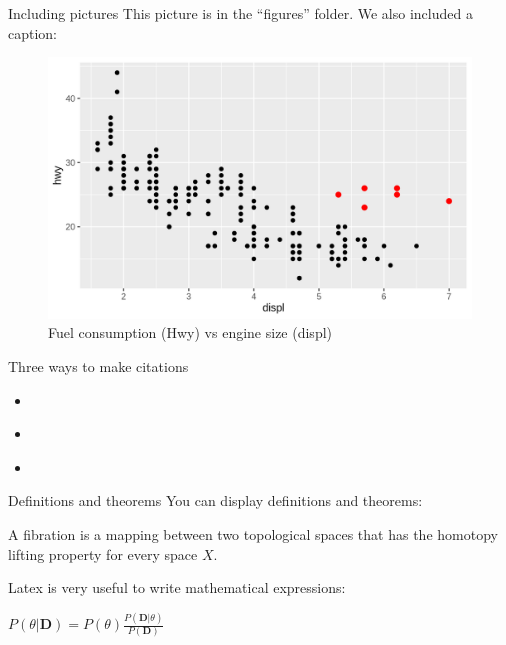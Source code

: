 \begin{frame}{Including pictures}
	This picture is in the ``figures'' folder. We also included a caption:
	\begin{figure}
	\includegraphics[scale=.5]{figures/graph.png}
	\caption{Fuel consumption (Hwy) vs engine size (displ)}
	\end{figure}
\end{frame}


\begin{frame}{Three ways to make citations}
	\begin{itemize}
	\item \cite{kass1995}
	\item \citep{kass1995}
	\item \citet{kass1995}
	\end{itemize}
\end{frame}


\begin{frame}{Definitions and theorems}
	You can display definitions and theorems:
	\begin{definition}[Fibration]
	A fibration is a mapping between two topological spaces that has the homotopy lifting property for every space $X$.
	\end{definition}
	Latex is very useful to write mathematical expressions:
	\begin{theorem}[Bayes]
	$P(\theta|\textbf{D}) = P(\theta ) \frac{P(\textbf{D} |\theta)}{P(\textbf{D})}$
	\end{theorem}
\end{frame}

